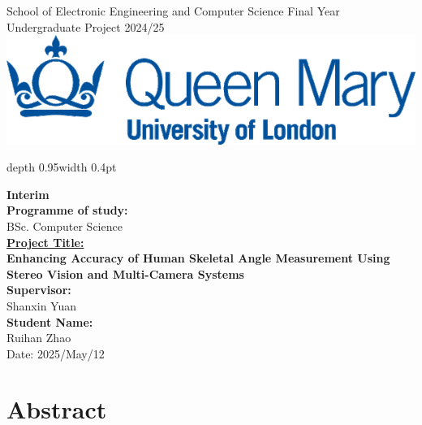\documentclass[a4paper,12pt]{article}
\renewcommand{\headrulewidth}{0.4pt}
\renewcommand{\headrulewidth}{0pt}
\newcommand{\removeheaderandfooter}{
  \pagestyle{empty}
  \fancyhead{}
  \fancyfoot{}
  \renewcommand{\headrulewidth}{0pt}
}
\begin{document}

\begin{titlepage}
\removeheaderandfooter
\noindent
\begin{minipage}[t][0.95\textheight][t]{0.48\textwidth}
\raggedright
{\fontsize{15}{18}\selectfont School of Electronic Engineering and Computer Science}
\vfill
{\fontsize{15}{18}\selectfont 
Final Year\\
Undergraduate Project 2024/25
}
\vspace{4em}\\
\includegraphics[width=0.6\linewidth]{qmul_logo.png} %
\end{minipage}
\hfill
\vrule depth 0.95\textheight width 0.4pt
\hfill
\begin{minipage}[t][0.95\textheight][t]{0.48\textwidth}
\raggedright
{\fontsize{14}{17}\selectfont
\textbf{Interim}\\ %
\textbf{Programme of study:}\\
BSc. Computer Science\\[4em]
}
{\fontsize{20}{24}\selectfont \uline{\textbf{Project Title:}}\\
\textbf{Enhancing Accuracy of Human Skeletal Angle Measurement Using Stereo Vision and Multi-Camera Systems}\\[4em]
{\fontsize{14}{17}\selectfont
\textbf{Supervisor:}\\
Shanxin Yuan\\[4em]
\textbf{Student Name:}\\
Ruihan Zhao\\[4em]
\vfill
Date: 2025/May/12
}}
\end{minipage}
\end{titlepage}

\setcounter{page}{2}

\clearpage
\removeheaderandfooter
\section*{Abstract}

\end{document}
